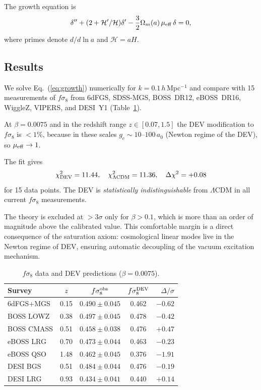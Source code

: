 \documentclass[aps,prd,twocolumn,showpacs,superscriptaddress]{revtex4-2}
\newcommand{\aO}{a_0}
\newcommand{\mueff}{\mu_{\rm eff}}
\newcommand{\LCDM}{$\Lambda$CDM}
\begin{document}
The growth equation is
\begin{equation}
  \delta'' + (2+\mathcal{H}'/\mathcal{H})\delta'
  - \frac{3}{2}\Omega_m(a)\,\mueff\,\delta = 0,
  \label{eq:growth}
\end{equation}
where primes denote $d/d\ln a$ and $\mathcal{H} = aH$.

\subsection{Results}

We solve Eq.~(\ref{eq:growth}) numerically for $k = 0.1\,h\,$Mpc$^{-1}$
and compare with 15 measurements of $f\sigma_8$ from 6dFGS, SDSS-MGS,
BOSS~DR12, eBOSS~DR16, WiggleZ, VIPERS, and DESI~Y1
(Table~\ref{tab:fsigma8}).

At $\beta = 0.0075$ and in the redshift range $z\in[0.07, 1.5]$
the DEV modification to $f\sigma_8$ is $< 1\%$,
because in these scales $g_c \sim 10$--$100\,\aO$
(Newton regime of the DEV), so $\mueff \to 1$.

The fit gives
\begin{equation}
  \chi^2_{\rm DEV} = 11.44, \quad
  \chi^2_{\Lambda{\rm CDM}} = 11.36, \quad
  \Delta\chi^2 = +0.08
\end{equation}
for 15 data points.
The DEV is \emph{statistically indistinguishable} from \LCDM{}
in all current $f\sigma_8$ measurements.

The theory is excluded at $>3\sigma$ only for $\beta > 0.1$,
which is more than an order of magnitude above the calibrated value.
This comfortable margin is a direct consequence of the saturation
axiom: cosmological linear modes live in the Newton regime of DEV,
ensuring automatic decoupling of the vacuum excitation mechanism.

\begin{table}[h]
\caption{$f\sigma_8$ data and DEV predictions ($\beta=0.0075$).}
\label{tab:fsigma8}
\begin{ruledtabular}
\begin{tabular}{lcccr}
Survey & $z$ & $f\sigma_8^{\rm obs}$ & $f\sigma_8^{\rm DEV}$ & $\Delta/\sigma$ \\
\hline
6dFGS+MGS    & 0.15 & $0.490\pm0.045$ & 0.462 & $-0.62$ \\
BOSS LOWZ    & 0.38 & $0.497\pm0.045$ & 0.478 & $-0.42$ \\
BOSS CMASS   & 0.51 & $0.458\pm0.038$ & 0.476 & $+0.47$ \\
eBOSS LRG   & 0.70 & $0.473\pm0.044$ & 0.463 & $-0.23$ \\
eBOSS QSO   & 1.48 & $0.462\pm0.045$ & 0.376 & $-1.91$ \\
DESI BGS    & 0.51 & $0.484\pm0.044$ & 0.476 & $-0.19$ \\
DESI LRG    & 0.93 & $0.434\pm0.041$ & 0.440 & $+0.14$ \\
\end{tabular}
\end{ruledtabular}
\end{table}
\end{document}
